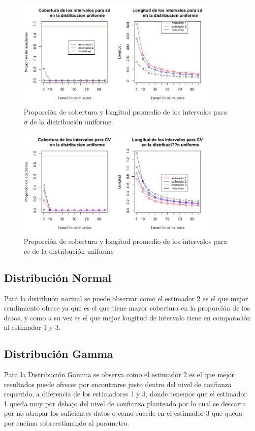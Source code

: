 \documentclass[letterpaper,12pt,onecolumn,titlepage]{article}
\begin{document}
\begin{figure}[!h]
    \begin{center}
        \includegraphics[width=10cm]{Figuras/Rplot04.png}
        \caption{Proporci\'{o}n de cobertura y longitud promedio de los intervalos para $\sigma$ de la distribuci\'{o}n uniforme}
        \label{fig:Densidad}
    \end{center}
\end{figure}

\begin{figure}[!h]
    \begin{center}
        \includegraphics[width=10cm]{Figuras/Rplot05.png}
        \caption{Proporci\'{o}n de cobertura y longitud promedio de los intervalos para $cv$ de la distribuci\'{o}n uniforme}
        \label{fig:Densidad}
    \end{center}
\end{figure}

\pagebreak
\subsection{Distribuci\'{o}n Normal}
Para la distribu\'{o}n normal se puede observar como el estimador 2 es el que mejor rendimiento ofrece ya que es el que tiene mayor cobertura en la proporci\'{o}n de los datos, y como a su vez es el que mejor longitud de intervalo tiene en comparaci\'{o}n al estimador 1 y 3.

\subsection{Distribuci\'{o}n  Gamma}
Para la Distribuci\'{o}n  Gamma se observa como el estimador 2 es el que mejor resultados puede ofrecer por encontrarse justo dentro del nivel de confianza requerido, a diferencia de los estimadores 1 y 3, donde tenemos que el estimador 1 queda muy por debajo del nivel de confianza planteado por lo cual se descarta por no atrapar los suficientes datos o como sucede en el estimador 3 que queda por encima sobreestimando al parametro.
\end{document}
